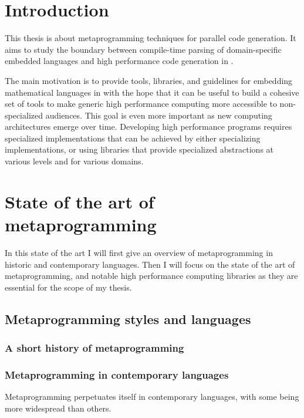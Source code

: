 \documentclass[../../main.tex]{subfiles}
\begin{document}

\chapter{Introduction}

This thesis is about metaprogramming techniques for parallel code generation.
It aims to study the boundary between compile-time parsing of
domain-specific embedded languages and high performance code generation in \cpp.

The main motivation is to provide tools, libraries, and guidelines for embedding
mathematical languages in \cpp with the hope that it can be useful to build a
cohesive set of tools to make generic high performance computing more accessible
to non-specialized audiences. This goal is even more important as new computing
architectures emerge over time. Developing high performance programs requires
specialized implementations that can be achieved by either specializing
implementations, or using libraries that provide specialized abstractions at
various levels and for various domains.

\chapter{State of the art of metaprogramming}

In this state of the art I will first give an overview of metaprogramming in
historic and contemporary languages. Then I will focus on the state of the art
of \cpp metaprogramming, and notable high performance computing libraries as they
are essential for the scope of my thesis.

\section{Metaprogramming styles and languages}

\subsection{A short history of metaprogramming}

\subsection{Metaprogramming in contemporary languages}

Metaprogramming perpetuates itself in contemporary languages,
with some being more widespread than others.
\end{document}
